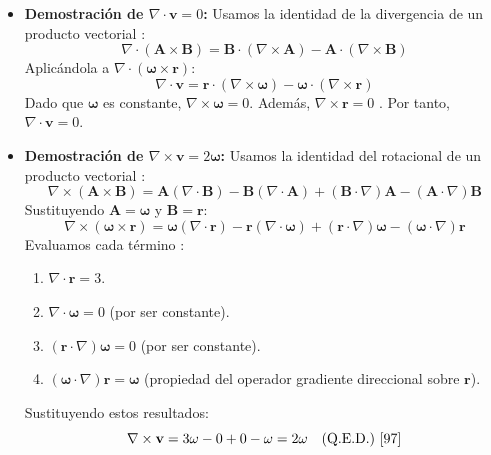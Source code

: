 \documentclass[a4paper]{article}
\begin{document}
\begin{itemize}
    \item \textbf{Demostración de $\nabla \cdot \mathbf{v} = 0$:}
    Usamos la identidad de la divergencia de un producto vectorial \cite{109}:
    \begin{equation}
        \nabla \cdot (\mathbf{A} \times \mathbf{B}) = \mathbf{B} \cdot (\nabla \times \mathbf{A}) - \mathbf{A} \cdot (\nabla \times \mathbf{B})
    \end{equation}
    Aplicándola a $\nabla \cdot (\mathbf{\omega} \times \mathbf{r})$:
    \begin{equation}
        \nabla \cdot \mathbf{v} = \mathbf{r} \cdot (\nabla \times \mathbf{\omega}) - \mathbf{\omega} \cdot (\nabla \times \mathbf{r})
    \end{equation}
    Dado que $\mathbf{\omega}$ es constante, $\nabla \times \mathbf{\omega} = 0$. Además, $\nabla \times \mathbf{r} = 0$ \cite{109}. Por tanto, $\nabla \cdot \mathbf{v} = 0$.

    \item \textbf{Demostración de $\nabla \times \mathbf{v} = 2\mathbf{\omega}$:}
    Usamos la identidad del rotacional de un producto vectorial \cite{109}:
    \begin{equation}
        \nabla \times (\mathbf{A} \times \mathbf{B}) = \mathbf{A}(\nabla \cdot \mathbf{B}) - \mathbf{B}(\nabla \cdot \mathbf{A}) + (\mathbf{B} \cdot \nabla)\mathbf{A} - (\mathbf{A} \cdot \nabla)\mathbf{B}
    \end{equation}
    Sustituyendo $\mathbf{A} = \mathbf{\omega}$ y $\mathbf{B} = \mathbf{r}$:
    \begin{equation}
        \nabla \times (\mathbf{\omega} \times \mathbf{r}) = \mathbf{\omega}(\nabla \cdot \mathbf{r}) - \mathbf{r}(\nabla \cdot \mathbf{\omega}) + (\mathbf{r} \cdot \nabla)\mathbf{\omega} - (\mathbf{\omega} \cdot \nabla)\mathbf{r}
    \end{equation}
    Evaluamos cada término \cite{109}:
    \begin{enumerate}
        \item $\nabla \cdot \mathbf{r} = 3$.
        \item $\nabla \cdot \mathbf{\omega} = 0$ (por ser constante).
        \item $(\mathbf{r} \cdot \nabla)\mathbf{\omega} = 0$ (por ser constante).
        \item $(\mathbf{\omega} \cdot \nabla)\mathbf{r} = \mathbf{\omega}$ (propiedad del operador gradiente direccional sobre $\mathbf{r}$).
    \end{enumerate}
    Sustituyendo estos resultados:
    \begin{equation}
        \nabla \times \mathbf{v} = 3\mathbf{\omega} - 0 + 0 - \mathbf{\omega} = 2\mathbf{\omega} \quad \text{(Q.E.D.) \cite{97}}
    \end{equation}
\end{itemize}
\end{document}
